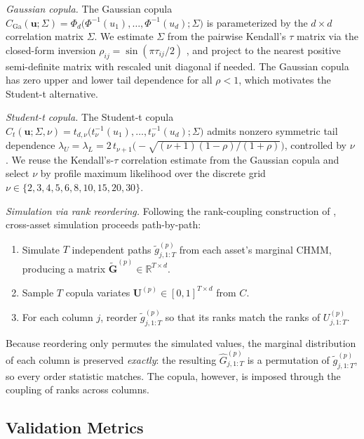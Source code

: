 \textit{Gaussian copula.}
The Gaussian copula $C_{\text{Ga}}(\mathbf{u}; \Sigma) = \Phi_d\bigl(\Phi^{-1}(u_1), \dots, \Phi^{-1}(u_d); \Sigma\bigr)$ is parameterized by the $d \times d$ correlation matrix $\Sigma$.
We estimate $\Sigma$ from the pairwise Kendall's $\tau$ matrix via the closed-form inversion $\rho_{ij} = \sin(\pi \tau_{ij} / 2)$ \cite{embrechts2002correlation, mcneil2015quantitative}, and project to the nearest positive semi-definite matrix with rescaled unit diagonal if needed.
The Gaussian copula has zero upper and lower tail dependence for all $\rho < 1$, which motivates the Student-t alternative.

\textit{Student-t copula.}
The Student-t copula $C_t(\mathbf{u}; \Sigma, \nu) = t_{d,\nu}\bigl(t_\nu^{-1}(u_1), \dots, t_\nu^{-1}(u_d); \Sigma\bigr)$ admits nonzero symmetric tail dependence $\lambda_U = \lambda_L = 2\, t_{\nu+1}\!\bigl(-\sqrt{(\nu+1)(1-\rho)/(1+\rho)}\bigr)$, controlled by $\nu$ \cite{demarta2005tcopula}.
We reuse the Kendall's-$\tau$ correlation estimate from the Gaussian copula and select $\nu$ by profile maximum likelihood over the discrete grid $\nu \in \{2, 3, 4, 5, 6, 8, 10, 15, 20, 30\}$.

\textit{Simulation via rank reordering.}
Following the rank-coupling construction of \citet{iman1982distribution}, cross-asset simulation proceeds path-by-path:
\begin{enumerate}
    \item Simulate $T$ independent paths $\tilde{g}_{j,1:T}^{(p)}$ from each asset's marginal CHMM, producing a matrix $\tilde{\mathbf{G}}^{(p)} \in \mathbb{R}^{T \times d}$.
    \item Sample $T$ copula variates $\mathbf{U}^{(p)} \in [0,1]^{T \times d}$ from $C$.
    \item For each column $j$, reorder $\tilde{g}_{j,1:T}^{(p)}$ so that its ranks match the ranks of $U_{j,1:T}^{(p)}$.
\end{enumerate}
Because reordering only permutes the simulated values, the marginal distribution of each column is preserved \emph{exactly}: the resulting $\hat{G}_{j,1:T}^{(p)}$ is a permutation of $\tilde{g}_{j,1:T}^{(p)}$, so every order statistic matches.
The copula, however, is imposed through the coupling of ranks across columns.

\subsection{Validation Metrics}
\label{sec:metrics}

